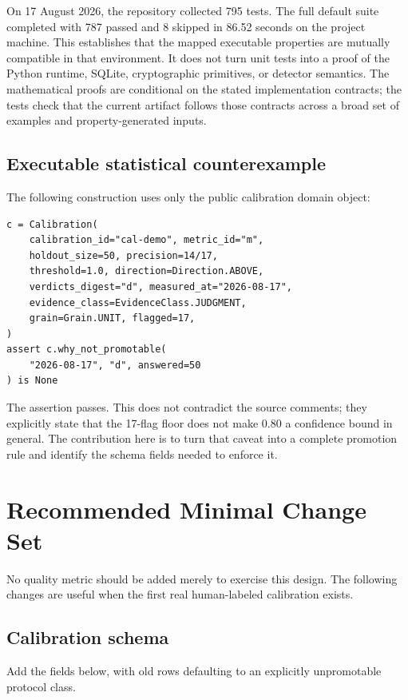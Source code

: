 \documentclass[11pt]{article}
\begin{document}
On 17 August 2026, the repository collected 795 tests. The full default suite completed with
787 passed and 8 skipped in 86.52 seconds on the project machine. This establishes that the
mapped executable properties are mutually compatible in that environment. It does not turn
unit tests into a proof of the Python runtime, SQLite, cryptographic primitives, or detector
semantics. The mathematical proofs are conditional on the stated implementation contracts;
the tests check that the current artifact follows those contracts across a broad set of
examples and property-generated inputs.

\subsection{Executable statistical counterexample}

The following construction uses only the public calibration domain object:

\begin{verbatim}
c = Calibration(
    calibration_id="cal-demo", metric_id="m",
    holdout_size=50, precision=14/17,
    threshold=1.0, direction=Direction.ABOVE,
    verdicts_digest="d", measured_at="2026-08-17",
    evidence_class=EvidenceClass.JUDGMENT,
    grain=Grain.UNIT, flagged=17,
)
assert c.why_not_promotable(
    "2026-08-17", "d", answered=50
) is None
\end{verbatim}

The assertion passes. This does not contradict the source comments; they explicitly state
that the 17-flag floor does not make 0.80 a confidence bound in general. The contribution
here is to turn that caveat into a complete promotion rule and identify the schema fields
needed to enforce it.

\section{Recommended Minimal Change Set}

No quality metric should be added merely to exercise this design. The following changes are
useful when the first real human-labeled calibration exists.

\subsection{Calibration schema}

Add the fields below, with old rows defaulting to an explicitly unpromotable protocol class.
\end{document}
